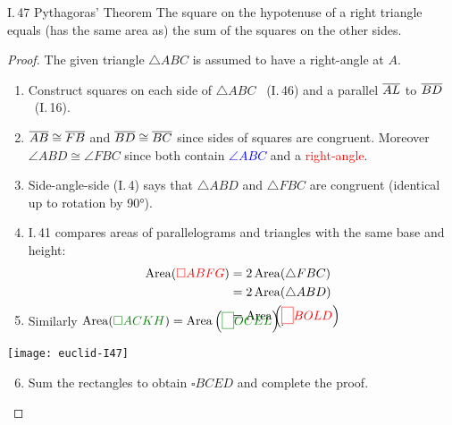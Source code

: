 \begin{thm}{I.\,47 Pythagoras' Theorem}{}
	The square on the hypotenuse of a right triangle equals (has the same area as) the sum of the squares on the other sides.
\end{thm}

\begin{proof} 
	The given triangle $\triangle ABC$ is assumed to have a right-angle at $A$.\par
	\begin{minipage}[t]{0.6\linewidth}\vspace{0pt}
	\begin{enumerate}\itemsep0pt
	  \item Construct squares on each side of $\triangle ABC$ \ (I.\,46) and a parallel $\overline{AL}$ to $\overline{BD}$ \ (I.\,16).
	  \item $\overline{AB}\cong\overline{FB}$ and $\overline{BD}\cong\overline{BC}$ since sides of squares are congruent. Moreover $\angle ABD\cong\angle FBC$ since both contain \textcolor{blue}{$\angle ABC$} and a \textcolor{red}{right-angle}.
	  \item Side-angle-side (I.\,4) says that $\triangle ABD$ and $\triangle FBC$ are congruent (identical up to rotation by \ang{90}).
		\item I.\,41 compares areas of parallelograms and triangles with the same base and height:\vspace{0pt}
		\begin{align*}
			\operatorname{Area}(\textcolor{red}{\square ABFG})&=2\operatorname{Area}(\triangle FBC)\\
			&=2\operatorname{Area}(\triangle ABD)\\
			&=\operatorname{Area}\left(\textcolor{red}{\fbox{\phantom{'}}BOLD}\right)\\[-25pt]
		\end{align*}
		\item Similarly $\operatorname{Area}(\textcolor{Green}{\square ACKH}) =\operatorname{Area}\left(\textcolor{Green}{\fbox{\phantom{'}}OCEL}\right)$.
	\end{enumerate}
	\end{minipage}
	\hfill
	\begin{minipage}[t]{0.39\linewidth}\vspace{0pt}
		\flushright
		\texttt{[image: euclid-I47]}
	\end{minipage}
	\begin{enumerate}\setcounter{enumi}{5}
		\item Sum the rectangles to obtain $\square BCED$ and complete the proof.\hfill\qedhere
	\end{enumerate}
\end{proof}



